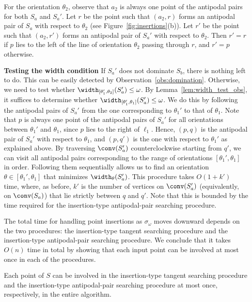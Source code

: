 For the orientation $\theta_2$, observe that $a_2$ is always one point of the antipodal pairs for both $S_a$ and $S_a'$. 
Let $r$ be the point such that $(a_2, r)$ forms an antipodal pair of $S_a$ with respect to $\theta_2$ (see Figure~\ref{fig:insertions}(b)). 
Let $r'$ be the point such that $(a_2, r')$ forms an antipodal pair of $S_a'$ with respect to $\theta_2$. 
Then $r' = r$ if $p$ lies to the left of the line of orientation $\theta_2$ passing through $r$, and $r' = p$ otherwise. 

\textbf{Testing the width condition }
If $S_a'$ does not dominate $S_b$, there is nothing left to do.
This can be easily detected by Observation~\ref{obs:domination}.
Otherwise, we need to test whether $\width_{[\theta_1', \theta_2]}(S_a') \le \omega$.
By Lemma~\ref{lem:width_test_obs}, it suffices to determine whether $\width_{[\theta_1', \theta_1]}(S_a') \le \omega$.
We do this by following the antipodal pairs of $S_a'$ from the one corresponding to $\theta_1'$ to that of $\theta_1$.
Note that $p$ is always one point of the antipodal pairs of $S_a'$ for all orientations between $\theta_1'$ and $\theta_1$, since $p$ lies to the right of $\ell_1$.
Hence, $(p, q)$ is the antipodal pair of $S_a'$ with respect to $\theta_1$, and $(p, q')$ is the one with respect to $\theta_1'$ as explained above.
By traversing $\conv(S_a')$ counterclockwise starting from $q'$, we can visit all antipodal pairs corresponding to the range of orientations $[\theta_1', \theta_1]$ in order.
Following them sequentially allows us to find an orientation $\theta \in [\theta_1', \theta_1]$ that minimizes $\width_\theta(S_a')$.
This procedure takes $O(1 + k')$ time, where, as before, $k'$ is the number of vertices on $\conv(S_a')$ (equivalently, on $\conv(S_a)$) that lie strictly between $q$ and $q'$.
Note that this is bounded by the time required for the insertion-type antipodal-pair searching procedure.





\medbreak
The total time for handling point insertions as $\sigma_\omega$ moves downward depends on the two procedures: the insertion-type tangent searching procedure and the insertion-type antipodal-pair searching procedure. 
We conclude that it takes $O(n)$ time in total by showing that each input point can be involved at most once in each of the procedures.


\begin{lemma}
    \label{lem:insertion_time}
    Each point of $S$ can be involved in the insertion-type tangent searching procedure and the insertion-type antipodal-pair searching procedure at most once, respectively, in the entire algorithm.
\end{lemma}

